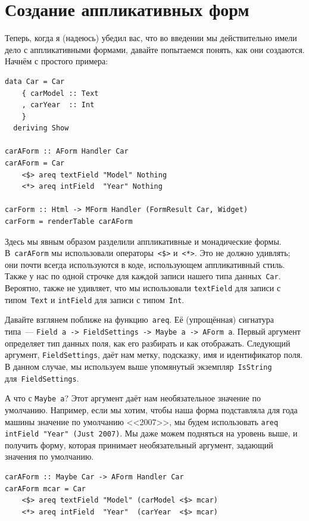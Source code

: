 \section{Создание аппликативных форм}
Теперь, когда я (надеюсь) убедил вас, что во введении мы действительно имели
дело с аппликативными формами, давайте попытаемся понять, как они создаются.
Начнём с простого примера:

\begin{lstlisting}
data Car = Car
    { carModel :: Text
    , carYear  :: Int
    }
  deriving Show

carAForm :: AForm Handler Car
carAForm = Car
    <$> areq textField "Model" Nothing
    <*> areq intField  "Year" Nothing

carForm :: Html -> MForm Handler (FormResult Car, Widget)
carForm = renderTable carAForm
\end{lstlisting}%

Здесь мы явным образом разделили аппликативные и монадические формы.
В~\lstinline'carAForm' мы использовали операторы~\lstinline'<$>'
и~\lstinline'<*>'. Это не должно удивлять; они почти всегда используются в
коде, использующем аппликативный стиль. Также у нас по одной строчке для каждой
записи нашего типа данных~\lstinline'Car'. Вероятно, также не удивляет, что мы
использовали \lstinline'textField' для записи с типом~\lstinline'Text' и
\lstinline'intField' для записи с типом~\lstinline'Int'.

Давайте взглянем поближе на функцию~\lstinline'areq'. Её (упрощённая)
сигнатура типа~--- \lstinline'Field a -> FieldSettings -> Maybe a -> AForm a'.
Первый аргумент определяет тип данных поля, как его разбирать и как
отображать.  Следующий аргумент, \lstinline'FieldSettings', даёт нам метку,
подсказку, имя и идентификатор поля. В данном случае, мы используем выше
упомянутый экземпляр~\lstinline'IsString' для~\lstinline'FieldSettings'.

А что с \lstinline'Maybe a'? Этот аргумент даёт нам необязательное
значение по умолчанию.  Например, если мы хотим, чтобы наша форма подставляла
для года машины значение по умолчанию <<2007>>, мы будем использовать
\lstinline'areq intField "Year" (Just 2007)'. Мы даже можем подняться на
уровень выше, и получить форму, которая принимает необязательный аргумент,
задающий значения по умолчанию.

\begin{lstlisting}
carAForm :: Maybe Car -> AForm Handler Car
carAForm mcar = Car
    <$> areq textField "Model" (carModel <$> mcar)
    <*> areq intField  "Year"  (carYear  <$> mcar)
\end{lstlisting}%

